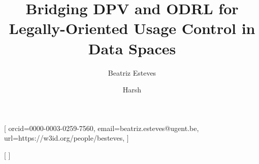 \documentclass{ceurart}
\begin{document}




\title{Bridging DPV and ODRL for Legally-Oriented Usage Control in Data Spaces}

\author[1]{Beatriz Esteves}[%
orcid=0000-0003-0259-7560,
email=beatriz.esteves@ugent.be,
url=https://w3id.org/people/besteves,
]
\cormark[1]

\author[2]{Harsh}[%
]

\address[1]{IDLab, Department of Electronics and Information Systems, Ghent University -- imec, Ghent, Belgium}
\address[2]{TODO}
\end{document}
